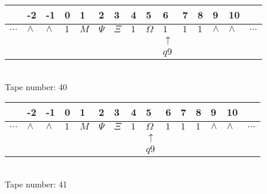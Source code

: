 \documentclass{article}
\begin{document}
\begin{table}[H]
\centering
\begin{tabular}{lllllllllllllll}
 & -2 & -1 & 0 & 1 & 2 & 3 & 4 & 5 & 6 & 7 & 8 & 9 & 10 & \\
\hline
$...$ & \multicolumn{1}{|l|}{$\wedge$} & \multicolumn{1}{|l|}{$\wedge$} & \multicolumn{1}{|l|}{$1$} & \multicolumn{1}{|l|}{$M$} & \multicolumn{1}{|l|}{$\Psi$} & \multicolumn{1}{|l|}{$\Xi$} & \multicolumn{1}{|l|}{$1$} & \multicolumn{1}{|l|}{$\Omega$} & \multicolumn{1}{|l|}{$1$} & \multicolumn{1}{|l|}{$1$} & \multicolumn{1}{|l|}{$1$} & \multicolumn{1}{|l|}{$\wedge$} & \multicolumn{1}{|l|}{$\wedge$} & $...$\\
\hline
&  &  &  &  &  &  &  &  & $\uparrow$ &  &  &  &  &  \\
&  &  &  &  &  &  &  &  & $ q9 $ &  &  &  &  &  \\
\end{tabular}
\\
Tape number: 40
\noindent\makebox[\linewidth]{\hdashrule{\textwidth}{1pt}{1pt}}\end{table}

\begin{table}[H]
\centering
\begin{tabular}{lllllllllllllll}
 & -2 & -1 & 0 & 1 & 2 & 3 & 4 & 5 & 6 & 7 & 8 & 9 & 10 & \\
\hline
$...$ & \multicolumn{1}{|l|}{$\wedge$} & \multicolumn{1}{|l|}{$\wedge$} & \multicolumn{1}{|l|}{$1$} & \multicolumn{1}{|l|}{$M$} & \multicolumn{1}{|l|}{$\Psi$} & \multicolumn{1}{|l|}{$\Xi$} & \multicolumn{1}{|l|}{$1$} & \multicolumn{1}{|l|}{$\Omega$} & \multicolumn{1}{|l|}{$1$} & \multicolumn{1}{|l|}{$1$} & \multicolumn{1}{|l|}{$1$} & \multicolumn{1}{|l|}{$\wedge$} & \multicolumn{1}{|l|}{$\wedge$} & $...$\\
\hline
&  &  &  &  &  &  &  & $\uparrow$ &  &  &  &  &  &  \\
&  &  &  &  &  &  &  & $ q9 $ &  &  &  &  &  &  \\
\end{tabular}
\\
Tape number: 41
\noindent\makebox[\linewidth]{\hdashrule{\textwidth}{1pt}{1pt}}\end{table}
\clearpage
\end{document}
